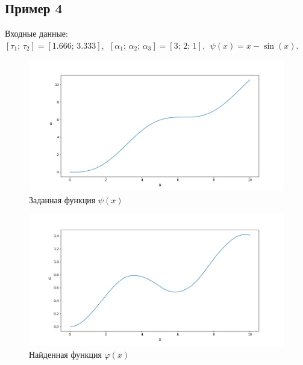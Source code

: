\documentclass{article}
\theoremstyle{definition}
\begin{document}
\subsection{Пример 4}
Входные данные: \\
$[\tau_1;\, \tau_2] = [1.666;\, 3.333]$, $\;[\alpha_1;\, \alpha_2;\, \alpha_3] = [3;\, 2;\, 1]$, 
$\;\psi(x) = x - \sin(x)$.
\begin{figure}[H]
	\centering
	\includegraphics[trim={2.475cm, 0, 0, 1.5cm}, clip, scale=0.624]{410_psi.png}
	\caption{Заданная функция $\psi(x)$}
	\label{fig:image9}
\end{figure}

\begin{figure}[H]
	\centering
	\includegraphics[trim={2.3cm, 0, 0, 1.5cm}, clip, scale=0.62]{4_u0.png}
	\caption{Найденная функция $\varphi(x)$}
	\label{fig:image10}
\end{figure}

\newpage
\end{document}
